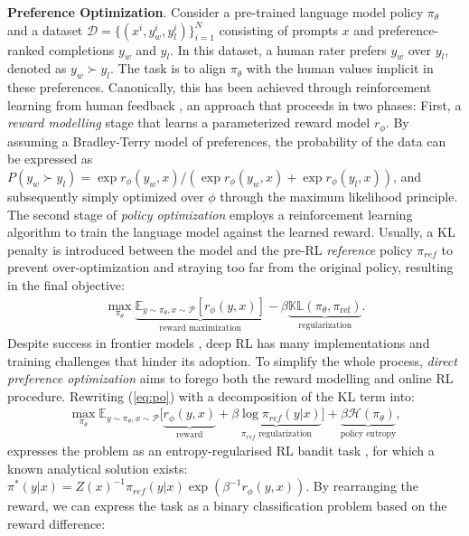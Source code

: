 \documentclass{article}
\theoremstyle{plain}
\theoremstyle{definition}
\theoremstyle{remark}
\begin{document}
\textbf{Preference Optimization}. Consider a pre-trained language model policy $\pi_\theta$ and a dataset $\mathcal{D} = \{(x^i,y_w^i, y_l^i)\}_{i=1}^N$ consisting of prompts $x$ and preference-ranked completions $y_w$ and $y_l$. In this dataset, a human rater prefers $y_w$ over $y_l$, denoted as $y_w \succ y_l$. The task is to align $\pi_\theta$ with the human values implicit in these preferences.
Canonically, this has been achieved through reinforcement learning from human feedback \citep[RLHF]{christiano2017deep}, an approach that proceeds in two phases: 
First, a \emph{reward modelling} stage that learns a parameterized reward model $r_\phi$.
By assuming a Bradley-Terry model \citep{bradley1952rank} of preferences, the probability of the data can be expressed as
$P(y_w \succ y_l) = \exp r_\phi({y_w,x}) / (\exp r_\phi({y_w,x}) + \exp r_\phi({y_l,x}))$, and subsequently simply optimized over $\phi$ through the maximum likelihood principle.
The second stage of \emph{policy optimization} employs a reinforcement learning algorithm to train the language model against the learned reward. Usually, a KL penalty is introduced between the model and the pre-RL \emph{reference} policy $\pi_{ref}$ \citep{jaques2019way,stiennon2020learning} to prevent over-optimization and straying too far from the original policy, resulting in the final objective:
\begin{align}
    \max_{\pi_\theta}  \underbrace{\mathbb{E}_{y\sim\pi_\theta, x\sim\mathcal{P}}\left[r_\phi(y,x)\right]}_{\text{reward maximization}} - \beta \underbrace{\mathbb{KL}(\pi_\theta,\pi_\text{ref})}_{\text{regularization}}.\label{eq:po}
\end{align}
Despite success in frontier models \citep{anthropic2023claude,geminiteam2023gemini}, deep RL has many implementations \citep{engstrom2019implementation} and training challenges \citep{sutton1984temporal,razin2023vanishing} that hinder its adoption.
To simplify the whole process, \emph{direct preference optimization} \citep[DPO]{rafailov2023direct} aims to forego both the reward modelling and online RL procedure.
Rewriting (\ref{eq:po}) with a decomposition of the KL term into:
\begin{align}
    \max_{\pi_\theta} \mathbb{E}_{y\sim \pi_\theta, x\sim\mathcal{P}} \Big[\underbrace{r_\phi(y,x)}_{\text{reward}} + \underbrace{\beta \log\pi_{ref}(y|x)}_{\text{$\pi_{ref}$ regularization}}\Big] + \underbrace{\beta \mathcal{H}(\pi_\theta)}_{\text{policy entropy}},\label{eq:po_entropy}
\end{align}
expresses the problem as an entropy-regularised RL bandit task \citep{ziebart2008maximum}, for which a known analytical solution exists: $\pi^*(y|x) = Z(x)^{-1}\pi_{ref}(y|x)\exp ( \beta^{-1} r_\phi(y,x) )$. By rearranging the reward, we can express the task as a binary classification problem based on the reward difference:
\end{document}
